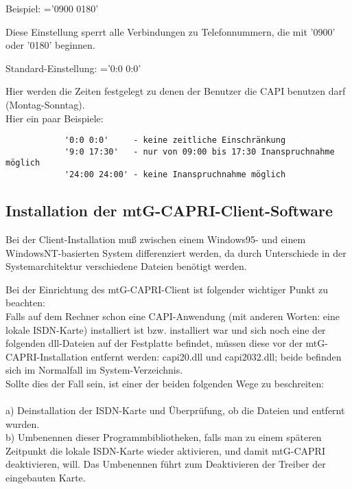 \begin{description}
        Beispiel: ='0900 0180'

        Diese Einstellung sperrt alle Verbindungen zu Telefonnummern, die mit '0900' oder '0180'
        beginnen.


        Standard-Einstellung: ='0:0 0:0'

        Hier werden die Zeiten festgelegt zu denen der Benutzer die CAPI benutzen darf (Montag-Sonntag). \\
        Hier ein paar Beispiele:
        \begin{verbatim}
            '0:0 0:0'     - keine zeitliche Einschränkung
            '9:0 17:30'   - nur von 09:00 bis 17:30 Inanspruchnahme möglich
            '24:00 24:00' - keine Inanspruchnahme möglich
        \end{verbatim}


\end{description}

\subsection{Installation der mtG-CAPRI-Client-Software}
    Bei der Client-Installation muß zwischen einem Windows95- und einem WindowsNT-basierten System
    differenziert werden, da durch Unterschiede in der Systemarchitektur verschiedene Dateien benötigt werden.

    Bei der Einrichtung des mtG-CAPRI-Client ist folgender wichtiger Punkt zu beachten: \\
    Falls auf dem Rechner schon eine CAPI-Anwendung (mit anderen Worten: eine lokale ISDN-Karte) installiert
    ist bzw. installiert war und sich noch eine der folgenden dll-Dateien auf der Festplatte befindet,
    müssen diese vor der mtG-CAPRI-Installation entfernt werden: capi20.dll und capi2032.dll;
    beide befinden sich im Normalfall im System-Verzeichnis. \\

    Sollte dies der Fall sein, ist einer der beiden folgenden Wege zu beschreiten: \\
    \\
    a) Deinstallation der ISDN-Karte und Überprüfung, ob die Dateien  und  entfernt wurden. \\
    b) Umbenennen dieser Programmbibliotheken, falls man zu einem späteren Zeitpunkt die lokale ISDN-Karte wieder
    aktivieren, und damit mtG-CAPRI deaktivieren, will. Das Umbenennen führt zum Deaktivieren der Treiber der eingebauten Karte. \\

